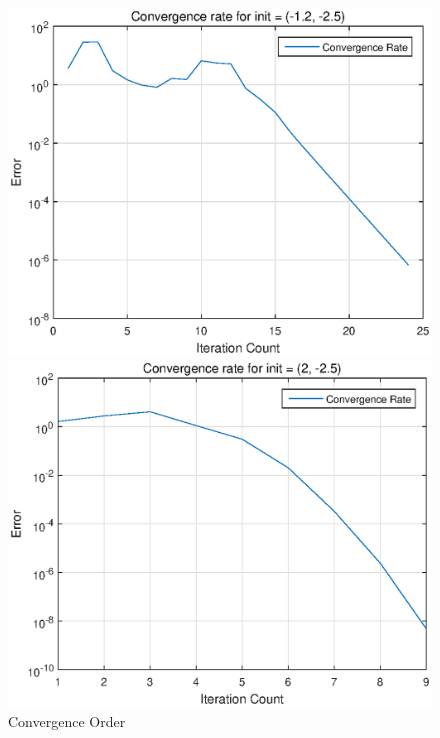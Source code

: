 \begin{figure}[!htb]
\begin{minipage}{0.45\textwidth}
\includegraphics[width = \textwidth]{res3.eps}
\end{minipage}
\begin{minipage}{0.45\textwidth}
\includegraphics[width = \textwidth]{res4.eps}
\end{minipage}
\caption{Convergence Order}
\label{Figure 1}
\end{figure}
